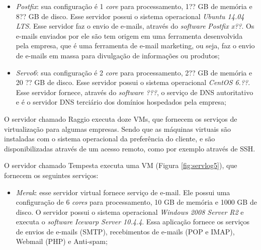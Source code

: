 \begin{itemize}
 \item \textit{Postfix}: sua configuração é 1 \textit{core} para processamento, 1?? GB de memória e 8?? GB de disco. Esse servidor possui o 
 sistema operacional \textit{Ubuntu 14.04 \ac{LTS}}. Esse servidor faz o envio de e-mails, através do \textit{software} \textit{Postfix x??}.
 Os e-mails enviados por ele são tem origem em uma ferramenta desenvolvida pela empresa, que é uma ferramenta de e-mail marketing, ou seja, 
 faz o envio de e-mails em massa para divulgação de informações ou produtos;
 
 \item \textit{Servo6}: sua configuração é 2 \textit{core} para processamento, 2?? GB de memória e 20 ?? GB de disco. Esse servidor possui o 
 sistema operacional \textit{CentOS 6.??}. Esse servidor fornece, através do \textit{software} \textit{???}, o serviço de \ac{DNS} autoritativo 
 e é o servidor \ac{DNS} terciário dos domínios hospedados pela empresa;
\end{itemize}

O servidor chamado Raggio executa doze \ac{VM}s, que fornecem os serviços de virtualização para algumas empresas. Sendo que as máquinas virtuais
são instaladas com o sistema operacional da preferência do cliente, e são disponibilizadas através de um acesso remoto, como por exemplo através
de \ac{SSH}.

O servidor chamado Tempesta executa uma \ac{VM} (Figura \ref{fig:servlog5}), que fornecem os seguintes serviços:
\begin{itemize}
  \item \textit{Merak}: esse servidor virtual fornece serviço de e-mail. Ele possui uma configuração de 6 \textit{cores} para processamento, 
 10 GB de memória e 1000 GB de disco. O servidor possui o sistema operacional \textit{Windows 2008 Server R2} e executa o \textit{software} 
 \textit{Icewarp Server 10.4.4}. Essa aplicação fornece os serviços de envios de e-mails (\ac{SMTP}), recebimentos de e-mails (\ac{POP} e 
 \ac{IMAP}), Webmail (\ac{PHP}) e Anti-spam;

\end{itemize}

